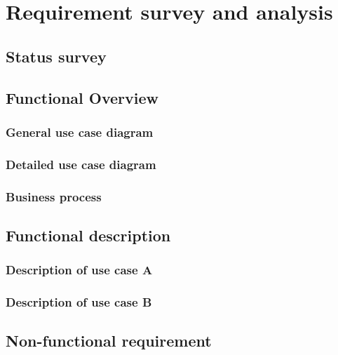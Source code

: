 \chapter{Requirement survey and analysis}

\section{Status survey}
\label{section:2.1}

\section{Functional Overview}
\label{section:2.2}

\subsection{General use case diagram}
\label{subsection:2.2.1}

\subsection{Detailed use case diagram}
\label{subsection:2.2.2}

\subsection{Business process}
\label{subsection:2.2.3}

\section{Functional description}
\label{section:2.3}

\subsection{Description of use case A}
\hfill

\subsection{Description of use case B}
\hfill

\section{Non-functional requirement}
\label{section:2.4}

